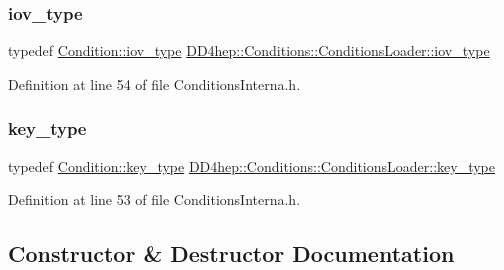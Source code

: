 \subsubsection{\texorpdfstring{iov\+\_\+type}{iov\_type}}
{\footnotesize\ttfamily typedef \hyperlink{class_d_d4hep_1_1_conditions_1_1_condition_ad84300e226b2085ec5e9db7f47be5539}{Condition\+::iov\+\_\+type} \hyperlink{class_d_d4hep_1_1_conditions_1_1_conditions_loader_a5647851492a3b1469208473fe6d96329}{D\+D4hep\+::\+Conditions\+::\+Conditions\+Loader\+::iov\+\_\+type}\hspace{0.3cm}{\ttfamily [protected]}}



Definition at line 54 of file Conditions\+Interna.\+h.

\hypertarget{class_d_d4hep_1_1_conditions_1_1_conditions_loader_ac77fe60ee60373d61aed19b200949c93}{}\label{class_d_d4hep_1_1_conditions_1_1_conditions_loader_ac77fe60ee60373d61aed19b200949c93} 
\subsubsection{\texorpdfstring{key\+\_\+type}{key\_type}}
{\footnotesize\ttfamily typedef \hyperlink{class_d_d4hep_1_1_conditions_1_1_condition_a7528efa762e8cc072ef80ea67c3531f9}{Condition\+::key\+\_\+type} \hyperlink{class_d_d4hep_1_1_conditions_1_1_conditions_loader_ac77fe60ee60373d61aed19b200949c93}{D\+D4hep\+::\+Conditions\+::\+Conditions\+Loader\+::key\+\_\+type}\hspace{0.3cm}{\ttfamily [protected]}}



Definition at line 53 of file Conditions\+Interna.\+h.



\subsection{Constructor \& Destructor Documentation}
\hypertarget{class_d_d4hep_1_1_conditions_1_1_conditions_loader_aabdcec15084838715825303678ba3e69}{}\label{class_d_d4hep_1_1_conditions_1_1_conditions_loader_aabdcec15084838715825303678ba3e69} 
